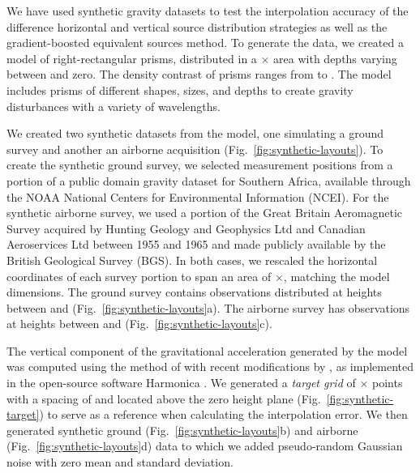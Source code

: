 We have used synthetic gravity datasets to test the interpolation accuracy of
the difference horizontal and vertical source distribution strategies as well
as the gradient-boosted equivalent sources method.
To generate the data, we created a model of \NPrisms{} right-rectangular
prisms,
distributed in a \ModelEasting{}$\times$\ModelNorthing{} area with depths
varying between \ModelDepth{} and zero.
The density contrast of prisms ranges from \ModelMinDensity{} to
\ModelMaxDensity{}.
The model includes prisms of different shapes, sizes, and depths to create
gravity disturbances with a variety of wavelengths.

We created two synthetic datasets from the model, one simulating a ground
survey and another an airborne acquisition (Fig.~\ref{fig:synthetic-layouts}).
To create the synthetic ground survey, we selected measurement positions from a
portion of a public domain gravity dataset for Southern Africa, available
through the NOAA National Centers for Environmental Information (NCEI).
For the synthetic airborne survey, we used a portion of the Great Britain
Aeromagnetic Survey acquired by Hunting Geology and Geophysics Ltd and Canadian
Aeroservices Ltd between 1955 and 1965 and made publicly available by the
British Geological Survey (BGS).
In both cases, we rescaled the horizontal coordinates of each survey portion to
span an area of \SurveyEasting{}$\times$\SurveyNorthing{}, matching the model
dimensions.
The ground survey contains \GroundSurveyPoints{} observations distributed at
heights between \GroundSurveyMinHeight{} and \GroundSurveyMaxHeight{}
(Fig.~\ref{fig:synthetic-layouts}a).
The airborne survey has \AirborneSurveyPoints{} observations at heights between
\AirborneSurveyMinHeight{} and \AirborneSurveyMaxHeight{}
(Fig.~\ref{fig:synthetic-layouts}c).

The vertical component of the gravitational acceleration generated by the
model was computed  using the method of \citet{nagy2000, nagy2002}
with recent modifications by \citet{fukushima2020},
as implemented in the open-source software Harmonica \citep{harmonica2021}.
We generated a \emph{target grid} of
\TargetEastingSize{}$\times$\TargetNorthingSize{} points with a spacing of
\TargetSpacing{} and located \TargetHeight{} above the zero height plane
(Fig.~\ref{fig:synthetic-target}) to serve as a reference when calculating the
interpolation error.
We then generated synthetic ground (Fig.~\ref{fig:synthetic-layouts}b) and
airborne (Fig.~\ref{fig:synthetic-layouts}d) data to which we added
pseudo-random Gaussian noise with zero mean and \SurveyNoise{} standard
deviation.


